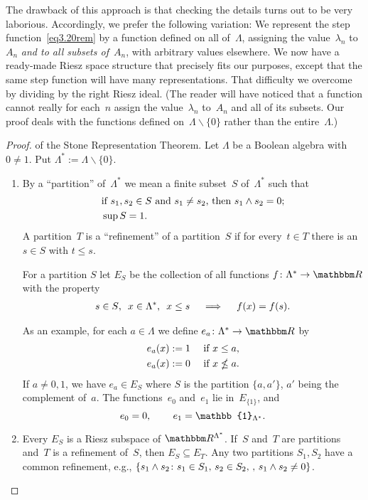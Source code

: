 \documentclass[main.tex]{subfiles}
\begin{document}
The drawback of this approach is that checking the details
turns out to be very laborious.
Accordingly,
we prefer the following variation:
We represent the step function~\eqref{eq3.20rem}
by a function defined on all of~$\Lambda$,
assigning the value~$\lambda_n$ to~$A_n$
\emph{and to all subsets of}~$A_n$,
with arbitrary values elsewhere.
We now have a ready-made Riesz space structure
that precisely fits our purposes,
except that the same step function will have many
representations.
That difficulty we overcome by dividing by
the right Riesz ideal.
(The reader will have noticed that
a function cannot really for each~$n$ assign the value~$\lambda_n$
to~$A_n$ and all of its subsets.
Our proof deals with the functions defined on~$\Lambda\backslash\{0\}$
rather than the entire~$\Lambda$.)
\begin{proof}
of the Stone Representation Theorem.
Let $\Lambda$ be a Boolean algebra with $0\neq 1$.
Put $\Lambda^*:=\Lambda \backslash\{0\}$.
\begin{enumerate}[label=(\Roman*),itemindent=3em,labelwidth=3em]
\item \label{3.20-I}
By a ``partition'' of~$\Lambda^*$
we mean a finite subset~$S$ of~$\Lambda^*$
such that
\begin{alignat*}{2}
& \text{if }s_1,s_2\in S\text{ and }s_1\neq s_2
   \text{, then }s_1\wedge s_2=0\text{;} \\
& \sup S=1\text{.}
\end{alignat*}
A partition~$T$ is a ``refinement'' of a partition~$S$
if for every~$t\in T$ there is an~$s\in S$ with $t\leq s$.

For a partition $S$ let $E_S$ be the collection
of all functions $f\colon \Lambda^* \ra \R$ with the property
\begin{align*}
s\in S\text{, }\ x\in\Lambda^*\text{, }\ x\leq s
\quad \implies \quad f(x)=f(s)\text{.}
\end{align*}

As an example,
for each $a\in\Lambda$ 
we define $e_a\colon \Lambda^* \ra \R$ by
\begin{alignat*}{2}
e_a(x) := 1 \quad & \text{ if } x\leq a\text{,} \\
e_a(x) := 0 \quad & \text{ if } x\nleq a\text{.}
\end{alignat*}
If $a\neq0,1$, we have $e_a\in E_S$ 
where $S$ is the partition $\{a, a'\}$,
$a'$ being the complement of~$a$.
The functions~$e_0$ and~$e_1$ lie in~$E_{\{1\}}$,
and
\begin{equation*}
e_0 = 0\htam{, } \qquad e_1 = \mathbb{1}_{\Lambda^*}\htam{.}
\end{equation*}
%
\item \label{3.20-II}
Every $E_S$ is a Riesz subspace of $\R^{\Lambda^*}$.
If~$S$ and~$T$ are partitions
and~$T$ is a refinement of~$S$,
then $E_S\subseteq E_T$.
Any two partitions $S_1,S_2$ 
have a common refinement,
e.g., $\{ s_1 \wedge s_2\colon s_1\in S_1\text{, }s_2\in S_2\text{, }\text{, }
  s_1 \wedge s_2 \neq 0\}$.


\end{enumerate}
\end{proof}
\end{document}
